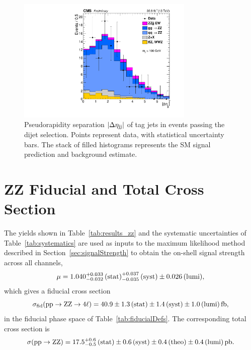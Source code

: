 \begin{figure}[htbp]
  \begin{center}
    \includegraphics[width=0.75\textwidth]{results/deltaEtajj.pdf}
    \caption[Dijet pseudorapidity separation]{
        Pseudorapidity separation $\lvert \Delta \eta_{\mathrm{j}\mathrm{j}} \rvert$ of tag jets in {\ZZ} events passing the dijet selection.
        Points represent data, with statistical uncertainty bars.
        The stack of filled histograms represents the SM signal prediction and background estimate.
      }\label{fig:deltaEtajj}
  \end{center}
\end{figure}


\section{ZZ Fiducial and Total Cross Section}

The yields shown in Table~\ref{tab:results_zz} and the systematic uncertainties of Table~\ref{tab:systematics} are used as inputs to the maximum likelihood method described in Section~\ref{sec:signalStrength} to obtain the on-shell {\ZZ} signal strength across all channels,
\begin{equation}
  \mu = 1.040 _{-0.032}^{+0.033} \,\text{(stat)} _{-0.035}^{+0.037} \,\text{(syst)} \pm 0.026 \,\text{(lumi)},
\end{equation}
which gives a fiducial cross section
\begin{equation}
  \sigma_\text{fid} (\mathrm{p}\mathrm{p} \to \mathrm{Z}\mathrm{Z} \to 4\ell) = 40.9 \pm 1.3 \,\text{(stat)} \pm 1.4 \,\text{(syst)} \pm 1.0 \,\text{(lumi)} \mathrm{\,fb},
\end{equation}
in the {\ZZfourl} fiducial phase space of Table~\ref{tab:fiducialDefs}.
The corresponding total cross section is
\begin{equation}
  \sigma(\mathrm{p}\mathrm{p} \to \mathrm{Z}\mathrm{Z}) = 17.5 _{-0.5}^{+0.6} \,\text{(stat)} \pm 0.6 \,\text{(syst)} \pm 0.4 \,\text{(theo)} \pm 0.4 \,\text{(lumi)} \mathrm{\,pb}.
\end{equation}

